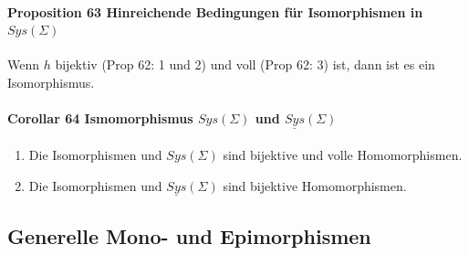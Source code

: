 \paragraph{Proposition 63 Hinreichende Bedingungen für Isomorphismen in $Sys(\Sigma)$}
Wenn $h$ bijektiv (Prop 62: 1 und 2) und voll (Prop 62: 3) ist, dann ist es ein Isomorphismus.

\paragraph{Corollar 64 Ismomorphismus $Sys(\Sigma)$ und $\underline{Sys}(\Sigma)$ }
\begin{enumerate}
\item Die Isomorphismen und $Sys(\Sigma)$ sind bijektive und volle Homomorphismen.
\item Die Isomorphismen und $\underline{Sys}(\Sigma)$ sind bijektive Homomorphismen.
\end{enumerate}

\subsection{Generelle Mono- und Epimorphismen}

